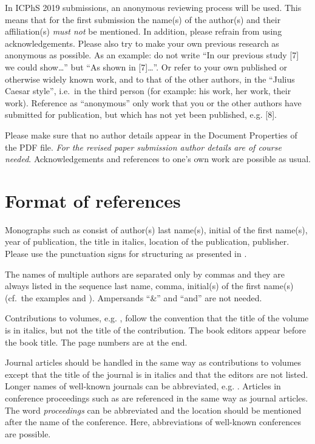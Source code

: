 \documentclass[a4paper,11pt,twocolumn]{article}
\begin{document}
In ICPhS 2019 submissions, an anonymous reviewing process will be used.
This means that for the first submission the name(s) of the author(s)
and their affiliation(s) \emph{must not} be mentioned. In addition,
please refrain from using acknowledgements. Please also try to make your
own previous research as anonymous as possible. As an example: do not
write ``In our previous study {[}7{]} we could show\ldots'' but ``As
shown in {[}7{]}\ldots''. Or refer to your own published or otherwise
widely known work, and to that of the other authors, in the ``Julius
Caesar style'', i.e.~in the third person (for example: his work, her
work, their work). Reference as ``anonymous'' only work that you or the
other authors have submitted for publication, but which has not yet been
published, e.g. {[}8{]}.

Please make sure that no author details appear in the Document
Properties of the PDF file.
\emph{For the revised paper submission author details are of 
course needed}. Acknowledgements and references to one's own work are
possible as usual.

\section{Format of references}

Monographs such as \cite{Fant:1960} consist of author(s) last name(s),
initial of the first name(s), year of publication, the title in italics,
location of the publication, publisher. Please use the punctuation signs
for structuring as presented in \cite{Fant:1960}.

The names of multiple authors are separated only by commas and they are
always listed in the sequence last name, comma, initial(s) of the first
name(s) (cf.~the examples \cite{Beattie/etal:1982} and
\cite{Peterson/Barney:1952}). Ampersands ``\&'' and ``and'' are not
needed.

Contributions to volumes, e.g. \cite{Stevens:1999}, follow the
convention that the title of the volume is in italics, but not the title
of the contribution. The book editors appear before the book title. The
page numbers are at the end.

Journal articles should be handled in the same way as contributions to
volumes except that the title of the journal is in italics and that the
editors are not listed. Longer names of well-known journals can be
abbreviated, e.g. \cite{Peterson/Barney:1952}. Articles in conference
proceedings such as \cite{Ladefoged:2003} are referenced in the same way
as journal articles. The word \textit{proceedings} can be abbreviated
and the location should be mentioned after the name of the conference.
Here, abbreviations of well-known conferences are possible.
\end{document}
